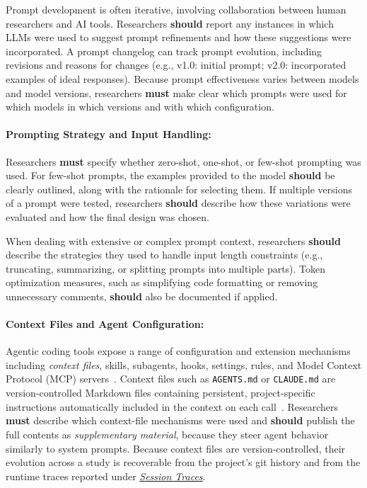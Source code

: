\documentclass[smallextended]{svjour3}
\newcommand{\must}{\textbf{must}\xspace}
\newcommand{\should}{\textbf{should}\xspace}
\newcommand{\supplementarymaterial}{\emph{supplementary material}\xspace}
\newcommand{\supplementarymaterial}{\emph{supplementary material}\xspace}
\newcommand{\traces}{\hyperref[sec:report-session-traces]{\emph{Session Traces}}\xspace}
\newcommand{\traces}{\href{/guidelines\#report-session-traces}{\emph{Session Traces}}\xspace}
\begin{document}
Prompt development is often iterative, involving collaboration between human researchers and AI tools.
Researchers \should report any instances in which LLMs were used to suggest prompt refinements and how these suggestions were incorporated.
A prompt changelog can track prompt evolution, including revisions and reasons for changes (e.g., v1.0: initial prompt; v2.0: incorporated examples of ideal responses).
Because prompt effectiveness varies between models and model versions, researchers \must make clear which prompts were used for which models in which versions and with which configuration.

\paragraph{Prompting Strategy and Input Handling:}
Researchers \must specify whether zero-shot, one-shot, or few-shot prompting was used.
For few-shot prompts, the examples provided to the model \should be clearly outlined, along with the rationale for selecting them.
If multiple versions of a prompt were tested, researchers \should describe how these variations were evaluated and how the final design was chosen.

When dealing with extensive or complex prompt context, researchers \should describe the strategies they used to handle input length constraints (e.g., truncating, summarizing, or splitting prompts into multiple parts).
Token optimization measures, such as simplifying code formatting or removing unnecessary comments, \should also be documented if applied.

\paragraph{Context Files and Agent Configuration:}
Agentic coding tools expose a range of configuration and extension mechanisms including \emph{context files}, skills, subagents, hooks, settings, rules, and Model Context Protocol (MCP) servers~\cite{galster2026configuring}.
Context files such as \texttt{AGENTS.md} or \texttt{CLAUDE.md} are version-controlled Markdown files containing persistent, project-specific instructions automatically included in the context on each call~\cite{mohsenimofidi2026context}.
Researchers \must describe which context-file mechanisms were used and \should publish the full contents as \supplementarymaterial, because they steer agent behavior similarly to system prompts.
Because context files are version-controlled, their evolution across a study is recoverable from the project's git history and from the runtime traces reported under \traces.
\end{document}
